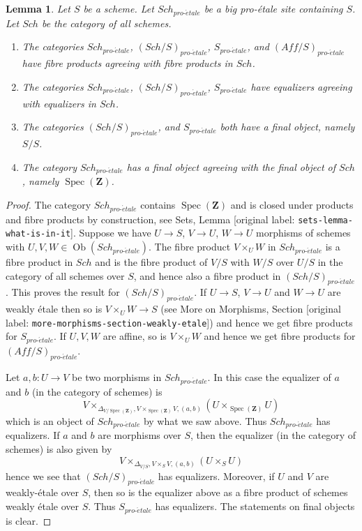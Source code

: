 \documentclass[10pt,a4paper]{article}
\theoremstyle{plain}
\newtheorem{lemma}[subsection]{Lemma}
\theoremstyle{definition}
\theoremstyle{remark}
\numberwithin{equation}{subsection}
\def\Spec{\mathop{\mathrm{Spec}}}
\def\Sch{\mathit{Sch}}
\def\Ob{\mathop{\mathrm{Ob}}\nolimits}
\def\proetale{{pro\text{-}\acute{e}tale}}
\begin{document}
\begin{lemma}
\label{lemma-fibre-products-proetale}
Let $S$ be a scheme. Let $\Sch_\proetale$ be a big pro-\'etale
site containing $S$. Let $\Sch$ be the category of all schemes.
\begin{enumerate}
\item The categories $\Sch_\proetale$, $(\Sch/S)_\proetale$,
$S_\proetale$, and $(\textit{Aff}/S)_\proetale$ have fibre products
agreeing with fibre products in $\Sch$.
\item The categories $\Sch_\proetale$, $(\Sch/S)_\proetale$,
$S_\proetale$ have equalizers agreeing with equalizers in $\Sch$.
\item The categories $(\Sch/S)_\proetale$, and $S_\proetale$ both have
a final object, namely $S/S$.
\item The category $\Sch_\proetale$ has a final object agreeing
with the final object of $\Sch$, namely $\Spec(\mathbf{Z})$.
\end{enumerate}
\end{lemma}

\begin{proof}
The category $\Sch_\proetale$ contains $\Spec(\mathbf{Z})$ and
is closed under products and fibre products by construction, see
Sets, Lemma \textnormal{[original label: \nolinkurl{sets-lemma-what-is-in-it}]}.
Suppose we have $U \to S$, $V \to U$, $W \to U$ morphisms
of schemes with $U, V, W \in \Ob(\Sch_\proetale)$.
The fibre product $V \times_U W$ in $\Sch_\proetale$
is a fibre product in $\Sch$ and
is the fibre product of $V/S$ with $W/S$ over $U/S$ in
the category of all schemes over $S$, and hence also a
fibre product in $(\Sch/S)_\proetale$.
This proves the result for $(\Sch/S)_\proetale$.
If $U \to S$, $V \to U$ and $W \to U$ are weakly \'etale then so is
$V \times_U W \to S$ (see
More on Morphisms, Section \textnormal{[original label: \nolinkurl{more-morphisms-section-weakly-etale}]})
and hence we get fibre products for $S_\proetale$.
If $U, V, W$ are affine, so is $V \times_U W$ and hence we
get fibre products for $(\textit{Aff}/S)_\proetale$.

\medskip\noindent
Let $a, b : U \to V$ be two morphisms in $\Sch_\proetale$.
In this case the equalizer of $a$ and $b$ (in the category of schemes) is
$$
V
\times_{\Delta_{V/\Spec(\mathbf{Z})}, V \times_{\Spec(\mathbf{Z})} V, (a, b)}
(U \times_{\Spec(\mathbf{Z})} U)
$$
which is an object of $\Sch_\proetale$ by what we saw above.
Thus $\Sch_\proetale$ has equalizers. If $a$ and $b$ are morphisms over $S$,
then the equalizer (in the category of schemes) is also given by
$$
V \times_{\Delta_{V/S}, V \times_S V, (a, b)} (U \times_S U)
$$
hence we see that $(\Sch/S)_\proetale$ has equalizers. Moreover, if
$U$ and $V$ are weakly-\'etale over $S$, then so is the equalizer
above as a fibre product of schemes weakly \'etale over $S$.
Thus $S_\proetale$ has equalizers. The statements on final objects
is clear.
\end{proof}
\end{document}
